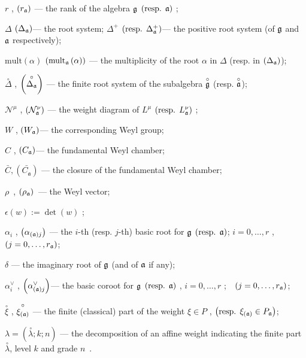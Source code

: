 \documentclass[a4paper,12pt]{article}
\theoremstyle{definition} \newtheorem{Def}{Definition}
\begin{document}
$r$ , $\left( r_{\frak{a}}\right) $ --- the rank of the algebra $\frak{g}$ $%
\left( \text{resp. }\frak{a}\right) $ ;

$\Delta $ $\left( \Delta _{\frak{a}}\right) $--- the root system; $\Delta
^{+} $ $\left( \text{resp. }\Delta _{\frak{a}}^{+}\right) $--- the positive
root system (of $\frak{g}$ and $\frak{a}$ respectively);

$\mathrm{mult}\left( \alpha \right) $ $\left( \mathrm{mult}_{\frak{a}}\left(
\alpha \right) \right) $ --- the multiplicity of the root $\alpha$ in $\Delta 
$ (resp. in $\left( \Delta _{\frak{a}}\right) $);

$\overset{\circ }{\Delta }$ , $\left( \overset{\circ }{\Delta _{\frak{a}}}%
\right) $ --- the finite root system of the subalgebra $\overset{\circ }{%
\frak{g}}$ (resp. $\overset{\circ }{\frak{a}}$);

$\mathcal{N}^{\mu }$ , $\left( \mathcal{N}_{\frak{a}}^{\nu }\right) $ --- the
weight diagram of $L^{\mu }$ $\left( \text{resp. }L_{\frak{a}}^{\nu }\right) 
$ ;

$W$ , $\left( W_{\frak{a}}\right) $--- the corresponding Weyl group;

$C$ , $\left( C_{\frak{a}}\right) $--- the fundamental Weyl chamber;

$\bar{C}, \left(\bar{C_{\mathfrak{a}}}\right)$ --- the closure of the fundamental Weyl chamber;

$\rho $\ , $\left( \rho _{\frak{a}}\right) $\ --- the Weyl vector;

$\epsilon \left( w\right) :=\det \left( w\right) $ ;

$\alpha _{i}$ , $\left( \alpha _{\left( \frak{a}\right) j}\right) $ --- the $i
$-th (resp. $j$-th) basic root for $\frak{g}$ $\left( \text{resp. }\frak{a}%
\right) $; $i=0,\ldots ,r$ ,\ \ $\left( j=0,\ldots ,r_{\frak{a}}\right) $;

$\delta $ --- the imaginary root of $\frak{g}$ (and of $\frak{a}$ if any);

$\alpha _{i}^{\vee }$ , $\left( \alpha _{\left( \frak{a}\right) j}^{\vee
}\right) $--- the basic coroot for $\frak{g}$ $\left( \text{resp. }\frak{a}%
\right) $ , $i=0,\ldots ,r$ ;\ \ $\left( j=0,\ldots ,r_{\frak{a}}\right) $;

$\overset{\circ }{\xi }$ , $\overset{\circ }{\xi _{\left( \frak{a}\right) }}$
--- the finite (classical) part of the weight $\xi \in P$ , $\left( \text{%
resp. }\xi _{\left( \frak{a}\right) }\in P_{\frak{a}}\right) $;

$\lambda =\left( \overset{\circ }{\lambda };k;n\right) $ --- the
decomposition of an affine weight indicating the finite part $\overset{\circ 
}{\lambda }$, level $k$ and grade $n$\ .
\end{document}
